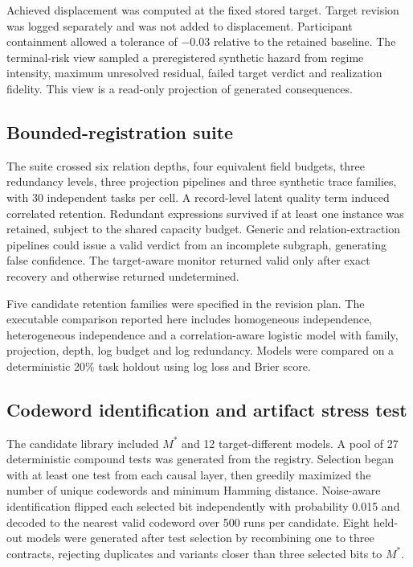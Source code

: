 \documentclass[10pt]{article}
\begin{document}
Achieved displacement was computed at the fixed stored target. Target revision was logged separately and was not added to displacement. Participant containment allowed a tolerance of $-0.03$ relative to the retained baseline. The terminal-risk view sampled a preregistered synthetic hazard from regime intensity, maximum unresolved residual, failed target verdict and realization fidelity. This view is a read-only projection of generated consequences.

\subsection*{Bounded-registration suite}
The suite crossed six relation depths, four equivalent field budgets, three redundancy levels, three projection pipelines and three synthetic trace families, with 30 independent tasks per cell. A record-level latent quality term induced correlated retention. Redundant expressions survived if at least one instance was retained, subject to the shared capacity budget. Generic and relation-extraction pipelines could issue a valid verdict from an incomplete subgraph, generating false confidence. The target-aware monitor returned valid only after exact recovery and otherwise returned undetermined.

Five candidate retention families were specified in the revision plan. The executable comparison reported here includes homogeneous independence, heterogeneous independence and a correlation-aware logistic model with family, projection, depth, log budget and log redundancy. Models were compared on a deterministic 20\% task holdout using log loss and Brier score.

\subsection*{Codeword identification and artifact stress test}
The candidate library included $M^*$ and 12 target-different models. A pool of 27 deterministic compound tests was generated from the registry. Selection began with at least one test from each causal layer, then greedily maximized the number of unique codewords and minimum Hamming distance. Noise-aware identification flipped each selected bit independently with probability 0.015 and decoded to the nearest valid codeword over 500 runs per candidate. Eight held-out models were generated after test selection by recombining one to three contracts, rejecting duplicates and variants closer than three selected bits to $M^*$.
\end{document}
